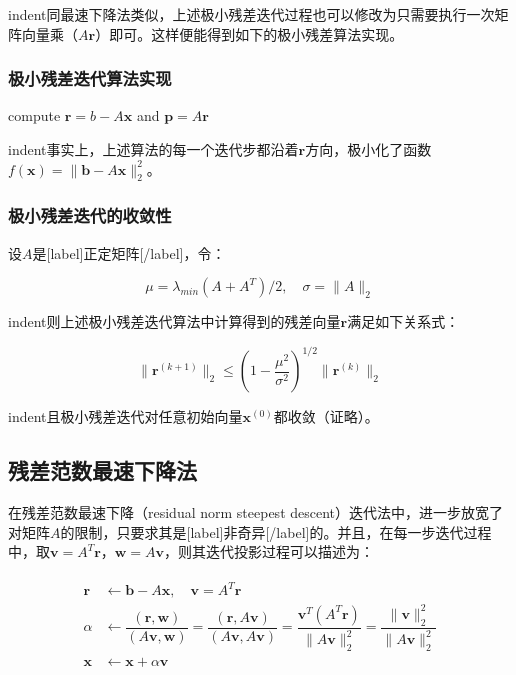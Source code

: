 \documentclass[UTF8,nofonts]{ctexart}
\begin{document}
indent同最速下降法类似，上述极小残差迭代过程也可以修改为只需要执行一次矩阵向量乘（$A\boldsymbol{r}$）即可。这样便能得到如下的极小残差算法实现。

\subsubsection*{极小残差迭代算法实现}

\begin{algorithm}[H]
compute $\boldsymbol{r}=b-A\boldsymbol{x}$ and $\boldsymbol{p}=A\boldsymbol{r}$\;
\end{algorithm}

indent事实上，上述算法的每一个迭代步都沿着$\boldsymbol{r}$方向，极小化了函数$f(\boldsymbol{x})=\|\boldsymbol{b}-A\boldsymbol{x}\|_2^2$。

\subsubsection*{极小残差迭代的收敛性}

设$A$是[label]正定矩阵[/label]，令：

\[\mu=\lambda_{min}(A+A^T)/2,\quad\sigma=\|A\|_2\]

indent则上述极小残差迭代算法中计算得到的残差向量$\boldsymbol{r}$满足如下关系式：

\[
\|\boldsymbol{r}^{(k+1)}\|_2\leq\left(1-\dfrac{\mu^2}{\sigma^2}\right)^{1/2}\|\boldsymbol{r}^{(k)}\|_2
\]

indent且极小残差迭代对任意初始向量$\boldsymbol{x}^{(0)}$都收敛（证略）。

\subsection*{残差范数最速下降法}

在残差范数最速下降（residual norm steepest descent）迭代法中，进一步放宽了对矩阵$A$的限制，只要求其是[label]非奇异[/label]的。并且，在每一步迭代过程中，取$\boldsymbol{v}=A^T\boldsymbol{r}$，$\boldsymbol{w}=A\boldsymbol{v}$，则其迭代投影过程可以描述为：

\begin{align}
\label{eq:rnsditer}
\begin{split}
\boldsymbol{r} &\gets \boldsymbol{b}-A\boldsymbol{x},\quad\boldsymbol{v}=A^T\boldsymbol{r}\\
\alpha &\gets \dfrac{(\boldsymbol{r},\boldsymbol{w})}{(A\boldsymbol{v},\boldsymbol{w})}=\dfrac{(\boldsymbol{r},A\boldsymbol{v})}{(A\boldsymbol{v},A\boldsymbol{v})}=\dfrac{\boldsymbol{v}^T(A^T\boldsymbol{r})}{\|A\boldsymbol{v}\|_2^2}=\dfrac{\|\boldsymbol{v}\|^2_2}{\|A\boldsymbol{v}\|_2^2}\\
\boldsymbol{x} &\gets \boldsymbol{x}+\alpha\boldsymbol{v}
\end{split}
\end{align}
\end{document}
